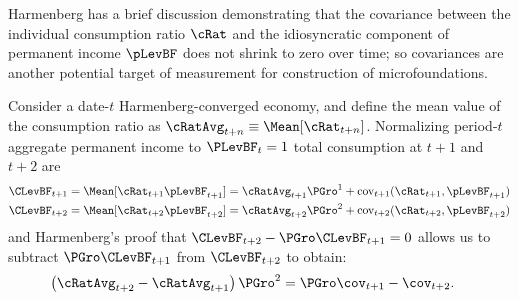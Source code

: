 \documentclass[BufferStockTheory]{subfiles}
\begin{document}
\begin{comment}
  From the perspective of period $t$, %
  \begin{align*}
    \BLevBF_{t+1} & = \Mean[b_{t+1} \pLevBF_{t+1}]
    \\              & = \PGro \Mean[\cRat_{t}(\Rfree/(\PGro\pShk_{t+1}))\pShk_{t+1}\pLevBF_{t}]
    \\              & = \PGro \Mean[\cRat_{t}\Rnorm\pLevBF_{t}]
    \\              & = \PGro \Mean[(\mRat_{t}-\cFunc(\mRat_{t}))\Rnorm\pLevBF_{t}]
    \\              & = \PGro \Mean[(\bRat_{t}+\tShk_{t}-\cFunc(\bRat_{t}+\tShk_{t}))\Rnorm\pLevBF_{t}]
  \end{align*}
\end{comment}

Harmenberg has a brief discussion demonstrating that the covariance between the individual consumption ratio $\cRat$ and the idiosyncratic component of permanent income $\pLevBF$ does not shrink to zero over time; so covariances are another potential target of measurement for construction of microfoundations.  %

Consider a date-$t$ Harmenberg-converged economy, and define the mean value of the consumption ratio as $\cRatAvg_{t+n} \equiv \Mean[\cRat_{t+n}]$.  Normalizing period-$t$ aggregate permanent income to $\PLevBF_{t}=1$ total consumption at $t+1$ and $t+2$ are
\begin{equation}\label{eq:atp2vsatp1}
  \begin{split}
    \CLevBF_{t+1} & = \Mean[\cRat_{t+1}\pLevBF_{t+1}] = \cRatAvg_{t+1}\PGro^{1} + \cv_{t+1}(\cRat_{t+1}, \pLevBF_{t+1}) 
    \\  \CLevBF_{t+2} & = \Mean[\cRat_{t+2}\pLevBF_{t+2}] = \cRatAvg_{t+2}\PGro^{2} + \cv_{t+2}(\cRat_{t+2}, \pLevBF_{t+2})
  \end{split}
\end{equation}
and Harmenberg's proof that $\CLevBF_{t+2}-\PGro \CLevBF_{t+1}=0$ allows us to subtract $\PGro \CLevBF_{t+1}$ from $\CLevBF_{t+2}$ to obtain:
\begin{equation} \label{eq:cNrmvsCov}\begin{split}
  \left(\cRatAvg_{t+2} - \cRatAvg_{t+1}\right)\PGro^{2} & = \PGro \cov_{t+1} - \cov_{t+2} . 
\end{split}\end{equation}
\end{document}

